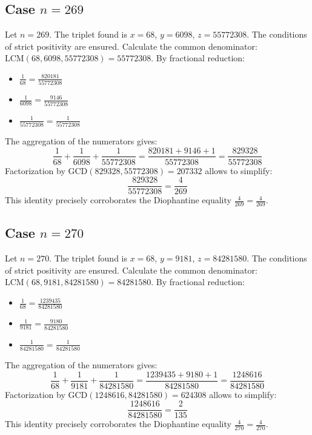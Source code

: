 \documentclass[11pt,a4paper]{article}
\begin{document}
\subsection{Case $n = 269$}
Let $n = 269$. The triplet found is $x = 68$, $y = 6098$, $z = 55772308$.
The conditions of strict positivity are ensured.
Calculate the common denominator: $\text{LCM}(68, 6098, 55772308) = 55772308$.
By fractional reduction:
\begin{itemize}
    \item $\frac{1}{68} = \frac{820181}{55772308}$
    \item $\frac{1}{6098} = \frac{9146}{55772308}$
    \item $\frac{1}{55772308} = \frac{1}{55772308}$
\end{itemize}
The aggregation of the numerators gives:
$$ \frac{1}{68} + \frac{1}{6098} + \frac{1}{55772308} = \frac{820181 + 9146 + 1}{55772308} = \frac{829328}{55772308} $$
Factorization by $\text{GCD}(829328, 55772308) = 207332$ allows to simplify:
$$ \frac{829328}{55772308} = \frac{4}{269} $$
This identity precisely corroborates the Diophantine equality $\frac{4}{269} = \frac{4}{269}$.

\subsection{Case $n = 270$}
Let $n = 270$. The triplet found is $x = 68$, $y = 9181$, $z = 84281580$.
The conditions of strict positivity are ensured.
Calculate the common denominator: $\text{LCM}(68, 9181, 84281580) = 84281580$.
By fractional reduction:
\begin{itemize}
    \item $\frac{1}{68} = \frac{1239435}{84281580}$
    \item $\frac{1}{9181} = \frac{9180}{84281580}$
    \item $\frac{1}{84281580} = \frac{1}{84281580}$
\end{itemize}
The aggregation of the numerators gives:
$$ \frac{1}{68} + \frac{1}{9181} + \frac{1}{84281580} = \frac{1239435 + 9180 + 1}{84281580} = \frac{1248616}{84281580} $$
Factorization by $\text{GCD}(1248616, 84281580) = 624308$ allows to simplify:
$$ \frac{1248616}{84281580} = \frac{2}{135} $$
This identity precisely corroborates the Diophantine equality $\frac{4}{270} = \frac{4}{270}$.
\end{document}
